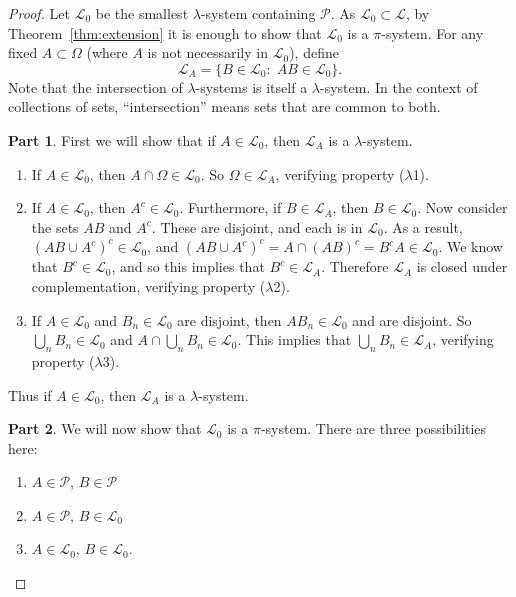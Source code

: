 \documentclass[11pt,fleqn]{book} %
\begin{document}
\begin{proof}
	Let $\mathcal{L}_0$ be the smallest $\lambda$-system containing $\mathcal{P}$. As $\mathcal{L}_0 \subset \mathcal{L}$, by Theorem~\ref{thm:extension} it is enough to show that $\mathcal{L}_0$ is a $\pi$-system. For any fixed $A \subset \Omega$ (where $A$ is not necessarily in $\mathcal{L}_0$), define
	\[
		\mathcal{L}_A = \{B \in \mathcal{L}_0:\;AB \in \mathcal{L}_0\}.
	\]
	Note that the intersection of $\lambda$-systems is itself a $\lambda$-system. In the context of collections of sets, ``intersection'' means sets that are common to both.

	\vspace{10pt}
	\textbf{Part 1}. First we will show that if $A \in \mathcal{L}_0$, then $\mathcal{L}_A$ is a $\lambda$-system.
	
	\begin{enumerate}
		\item If $A \in \mathcal{L}_0$, then $A \cap \Omega \in \mathcal{L}_0$. So $\Omega \in \mathcal{L}_A$, verifying property ($\lambda$1).
		\item If $A \in \mathcal{L}_0$, then $A^c \in \mathcal{L}_0$. Furthermore, if $B \in \mathcal{L}_A$, then $B \in \mathcal{L}_0$. Now consider the sets $AB$ and $A^c$. These are disjoint, and each is in $\mathcal{L}_0$. As a result, $(AB \cup A^c)^c \in \mathcal{L}_0$, and $(AB \cup A^c)^c = A \cap (AB)^c = B^cA \in \mathcal{L}_0$. We know that $B^c \in \mathcal{L}_0$, and so this implies that $B^c \in \mathcal{L}_A$. Therefore $\mathcal{L}_A$ is closed under complementation, verifying property ($\lambda$2).
		\item If $A \in \mathcal{L}_0$ and $B_n \in \mathcal{L}_0$ are disjoint, then $AB_n \in \mathcal{L}_0$ and are disjoint. So $\bigcup_n B_n \in \mathcal{L}_0$ and $A \cap \bigcup_n B_n \in \mathcal{L}_0$. This implies that $\bigcup_n B_n \in \mathcal{L}_A$, verifying property ($\lambda$3).
	\end{enumerate}

	Thus if $A \in \mathcal{L}_0$, then $\mathcal{L}_A$ is a $\lambda$-system.

	\vspace{10pt}
	\textbf{Part 2}. We will now show that $\mathcal{L}_0$ is a $\pi$-system. There are three possibilities here:

	\begin{enumerate}
		\item $A \in \mathcal{P}$, $B \in \mathcal{P}$
		\item $A \in \mathcal{P}$, $B \in \mathcal{L}_0$
		\item $A \in \mathcal{L}_0$, $B \in \mathcal{L}_0$.
	\end{enumerate}


\end{proof}
\end{document}
